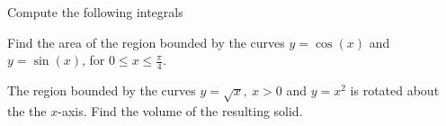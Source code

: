 \documentclass[11pt]{exam}
\begin{document}
%
%
%

\begin{questions}



\addpoints
\question Compute the following integrals

\newpage
\addpoints
\question[1] Find the area of the region bounded by the curves $y=\cos(x)$ and $y=\sin(x)$, for $0 \leq x \leq \frac{\pi}{4}$. 

\newpage
\addpoints
\question[2] The region bounded by the curves $y=\sqrt{x}, \ x>0$ and $y=x^2$ is rotated about the the $x$-axis. Find the volume of the resulting solid. 



\end{questions}
\end{document}
